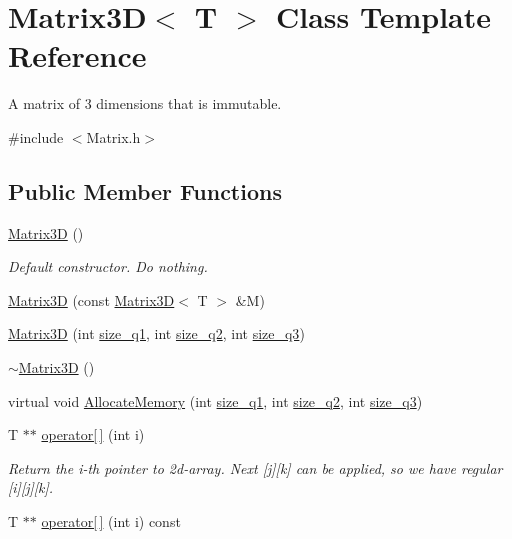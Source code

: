 \hypertarget{class_matrix3_d}{}\section{Matrix3\+D$<$ T $>$ Class Template Reference}
\label{class_matrix3_d}


A matrix of 3 dimensions that is immutable.  




{\ttfamily \#include $<$Matrix.\+h$>$}

\subsection*{Public Member Functions}
\begin{DoxyCompactItemize}
\item 
\hypertarget{class_matrix3_d_a1589c062f12fbbb1f3681f90c20c4b78}{}\hyperlink{class_matrix3_d_a1589c062f12fbbb1f3681f90c20c4b78}{Matrix3\+D} ()\label{class_matrix3_d_a1589c062f12fbbb1f3681f90c20c4b78}

\begin{DoxyCompactList}\small\item\em Default constructor. Do nothing. \end{DoxyCompactList}\item 
\hyperlink{class_matrix3_d_a1e257f12f4c8aa2477de663544ecce4e}{Matrix3\+D} (const \hyperlink{class_matrix3_d}{Matrix3\+D}$<$ T $>$ \&M)
\item 
\hyperlink{class_matrix3_d_a23dca87cfdc4f3a6e9d8d102f7800102}{Matrix3\+D} (int \hyperlink{class_matrix3_d_a17b970c10970ba4afb4eeeceac982923}{size\+\_\+q1}, int \hyperlink{class_matrix3_d_a67850dcae2638afe85050b8cf304a98c}{size\+\_\+q2}, int \hyperlink{class_matrix3_d_a7da71b86af303a7d565763ff808df477}{size\+\_\+q3})
\item 
\hyperlink{class_matrix3_d_a7fda610223910a2b4dcfea445d2eb6c7}{$\sim$\+Matrix3\+D} ()
\item 
virtual void \hyperlink{class_matrix3_d_a516afefd35f6077c149b172e5e0e1cda}{Allocate\+Memory} (int \hyperlink{class_matrix3_d_a17b970c10970ba4afb4eeeceac982923}{size\+\_\+q1}, int \hyperlink{class_matrix3_d_a67850dcae2638afe85050b8cf304a98c}{size\+\_\+q2}, int \hyperlink{class_matrix3_d_a7da71b86af303a7d565763ff808df477}{size\+\_\+q3})
\item 
T $\ast$$\ast$ \hyperlink{class_matrix3_d_ad4f7a9485cf64e02a8cfe083c97e3227}{operator\mbox{[}$\,$\mbox{]}} (int i)
\begin{DoxyCompactList}\small\item\em Return the i-\/th pointer to 2d-\/array. Next \mbox{[}j\mbox{]}\mbox{[}k\mbox{]} can be applied, so we have regular \mbox{[}i\mbox{]}\mbox{[}j\mbox{]}\mbox{[}k\mbox{]}. \end{DoxyCompactList}\item 
\hypertarget{class_matrix3_d_a936c36212e7153a70536d005a681fd7c}{}T $\ast$$\ast$ \hyperlink{class_matrix3_d_a936c36212e7153a70536d005a681fd7c}{operator\mbox{[}$\,$\mbox{]}} (int i) const \label{class_matrix3_d_a936c36212e7153a70536d005a681fd7c}


\end{DoxyCompactItemize}
